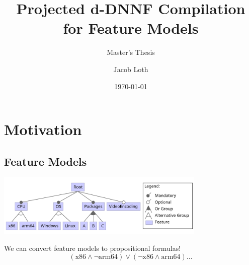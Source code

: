 \documentclass[
	aspectratio=169, %
	8pt, %
]{beamer}
\title[Projected d-DNNF Compilation]{Projected d-DNNF Compilation for Feature Models} %
\subtitle{Master's Thesis} %
\author[Jacob Loth]{Jacob Loth} %
\date{\today} %
\begin{document}
\maketitle %

\section{Motivation}

\subsection{Feature Models}
\begin{frame}{\insertsubsection}
	\centering
	\includegraphics[width=10cm]{fm.png}
    \begin{block}{}
        We can convert feature models to propositional formulas!
        \begin{equation*}
            (\text{x86} \land \neg \text{arm64}) \lor (\neg \text{x86} \land \text{arm64}) ...
        \end{equation*}
    \end{block}
\end{frame}
\end{document}
